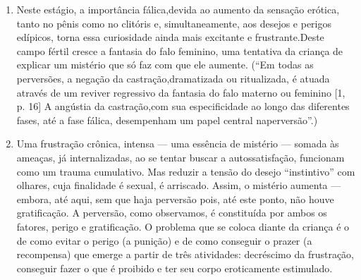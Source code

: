 \begin{enumerate}
\item Neste estágio, a importância fálica,\idxfalo[|(] devida ao aumento da
sensação erótica, tanto no pênis como no clitóris e, simultaneamente,
aos desejos e perigos edípicos, torna essa curiosidade ainda mais
excitante e frustrante.\idxinfanexcit[|)] Deste campo fértil cresce a fantasia do falo
feminino, uma tentativa da criança de explicar um mistério que só faz
com que ele aumente. (``Em todas as perversões, a negação
da castração,\idxcastaconf[|)] dramatizada ou ritualizada, é atuada através de um
reviver regressivo da fantasia do falo materno ou feminino [1, p.
16] A angústia da\idxfeticangu{} castração,\idxinfanangu[|)] com sua especificidade ao longo das
diferentes fases, até a fase fálica,\idxfasef{} desempenham um papel central na\idxfalo[|)]
perversão''\idxanguinfa[|)] [1, p. 28].)

\item Uma frustração crônica, intensa --- uma essência de mistério
--- somada às ameaças, já internalizadas, ao se tentar buscar a
autossatisfação, funcionam como um trauma\idxtrauma{} cumulativo. Mas reduzir a
tensão do desejo ``instintivo'' com olhares,
cuja finalidade é sexual, é arriscado. Assim, o mistério aumenta ---
embora, até aqui, sem que haja perversão pois, até este ponto, não
houve gratificação. A perversão, como observamos, é constituída por
ambos os fatores, perigo e gratificação. O problema que se coloca
diante da criança é o de como evitar o perigo (a punição) e de como
conseguir o prazer (a recompensa) que emerge a partir de três
atividades: decréscimo da frustração, conseguir fazer o que é proibido
e ter seu corpo eroticamente estimulado.


\end{enumerate}
